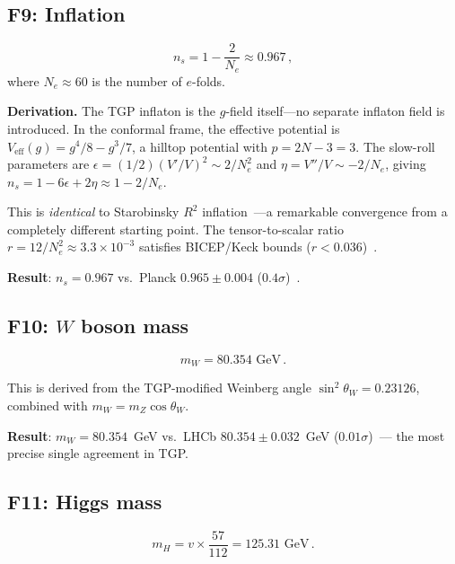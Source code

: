 \documentclass[aps,prd,twocolumn,superscriptaddress,showpacs,
  nofootinbib,floatfix,longbibliography]{revtex4-2}
\begin{document}
\subsection{F9: Inflation}\label{ssec:F9}

\begin{equation}\label{eq:F9}
  \boxed{n_s = 1 - \frac{2}{N_e} \approx 0.967}\,,
\end{equation}
where $N_e \approx 60$ is the number of $e$-folds.

\textbf{Derivation.}
The TGP inflaton is the $g$-field itself---no separate inflaton field
is introduced. In the conformal frame, the effective potential is
$V_\mathrm{eff}(g) = g^4/8 - g^3/7$, a hilltop potential with
$p = 2N - 3 = 3$.
The slow-roll parameters are
$\epsilon = (1/2)(V'/V)^2 \sim 2/N_e^2$ and
$\eta = V''/V \sim -2/N_e$,
giving $n_s = 1 - 6\epsilon + 2\eta \approx 1 - 2/N_e$.

This is \emph{identical} to Starobinsky $R^2$
inflation~\cite{Starobinsky1980}---a remarkable convergence from
a completely different starting point. The tensor-to-scalar ratio
$r = 12/N_e^2 \approx 3.3 \times 10^{-3}$ satisfies BICEP/Keck
bounds ($r < 0.036$)~\cite{BICEP}.

\textbf{Result}: $n_s = 0.967$ vs.\ Planck $0.965 \pm 0.004$
($0.4\sigma$)~\cite{Planck2018}.


\subsection{F10: \texorpdfstring{$W$}{W} boson mass}\label{ssec:F10}

\begin{equation}\label{eq:F10}
  \boxed{m_W = 80.354 \text{ GeV}}\,.
\end{equation}

This is derived from the TGP-modified Weinberg angle
$\sin^2\theta_W = 0.23126$, combined with $m_W = m_Z \cos\theta_W$.

\textbf{Result}: $m_W = 80.354$~GeV vs.\ LHCb
$80.354 \pm 0.032$~GeV ($0.01\sigma$)~\cite{LHCb_mW}---
the most precise single agreement in TGP.


\subsection{F11: Higgs mass}\label{ssec:F11}

\begin{equation}\label{eq:F11}
  \boxed{m_H = v \times \frac{57}{112} = 125.31 \text{ GeV}}\,.
\end{equation}
\end{document}
